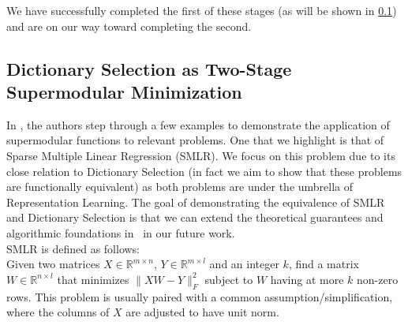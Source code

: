 \documentclass{article}
\newcommand{\R}{\mathbb{R}}
\begin{document}
We have successfully completed the first of these stages (as will be shown in \ref{supermodTwoStage}) and are on our way toward completing the second.

\subsection{Dictionary Selection as Two-Stage Supermodular Minimization} \label{supermodTwoStage}

In \cite{BoutsidisLS15}, the authors step through a few examples to demonstrate the application of supermodular functions to relevant problems. One that we highlight is that of Sparse Multiple Linear Regression (SMLR). We focus on this problem due to its close relation to Dictionary Selection (in fact we aim to show that these problems are functionally equivalent) as both problems are under the umbrella of Representation Learning. The goal of demonstrating the equivalence of SMLR and Dictionary Selection is that we can extend the theoretical guarantees and algorithmic foundations in~\cite{BoutsidisLS15} in our future work. 
\\

SMLR is defined as follows:\\
Given two matrices $X\in\R^{m\times n}$, $Y\in\R^{m\times l}$ and an integer $k$, find a matrix  $W\in\R^{n\times l}$ that minimizes $\|XW-Y\|^2_F$ subject to $W$ having at more $k$ non-zero rows. This problem is usually paired with a common assumption/simplification, where the columns of $X$ are adjusted to have unit norm.
\\
\end{document}
